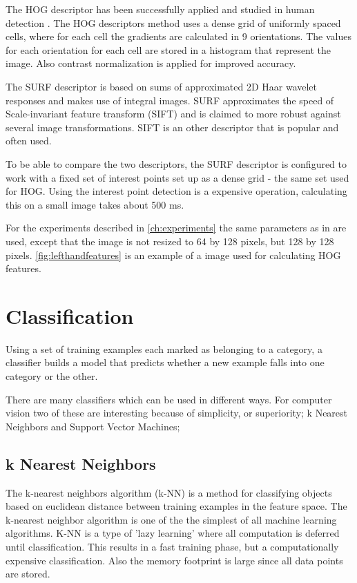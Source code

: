 The HOG descriptor has been successfully applied and studied in human detection \cite{NavneetDalal2006, watanabe2009}. The HOG descriptors method uses a dense grid of uniformly spaced cells, where for each cell the gradients are calculated in 9 orientations. The values for each orientation for each cell are stored in a histogram that represent the image. Also contrast normalization is applied for improved accuracy.

The SURF descriptor is based on sums of approximated 2D Haar wavelet responses and makes use of integral images. SURF approximates the speed of Scale-invariant feature transform (SIFT) and is claimed to more robust against several image transformations\cite{Murillo2007, Valgren2010}. SIFT is an other descriptor that is popular and often used.

To be able to compare the two descriptors, the SURF descriptor is configured to work with a fixed set of interest points set up as a dense grid - the same set used for HOG. Using the interest point detection is a expensive operation, calculating this on a small image takes about 500 ms.

For the experiments described in \autoref{ch:experiments} the same parameters as in \cite{watanabe2009} are used, except that the image is not resized to 64 by 128 pixels, but 128 by 128 pixels. \autoref{fig:lefthandfeatures} is an example of a image used for calculating HOG features.



\section{Classification}
Using a set of training examples each marked as belonging to a category, a classifier builds a model that predicts whether a new example falls into one category or the other. 

There are many classifiers which can be used in different ways. For computer vision two of these are interesting because of simplicity, or superiority; k Nearest Neighbors and Support Vector Machines;

\subsection*{k Nearest Neighbors}
The k-nearest neighbors algorithm (k-NN) is a method for classifying objects based on euclidean distance between training examples in the feature space. The k-nearest neighbor algorithm is one of the the simplest of all machine learning  algorithms. K-NN is a type of 'lazy learning' where all computation is deferred until classification. This results in a fast training phase, but a computationally expensive classification. Also the memory footprint is large since all data points are stored. 

